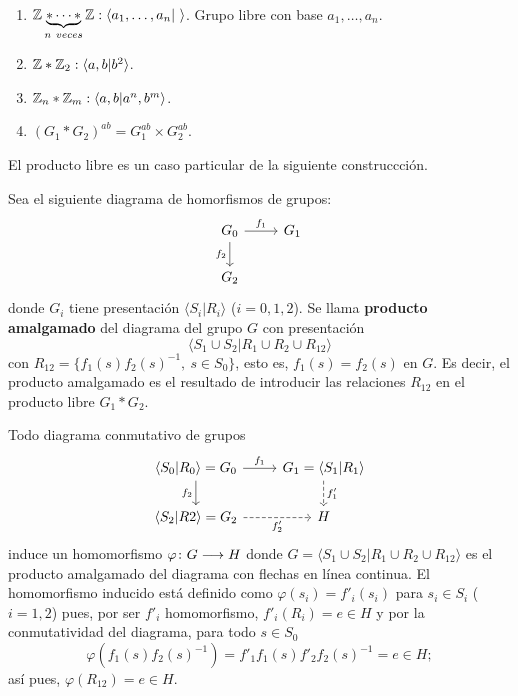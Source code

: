 \documentclass[GTSResumen.tex]{subfiles}
\begin{document}
\begin{ej}\
\begin{enumerate}
\item $\mathbb{Z}\underbrace{*\cdots *}_{n\ veces}\mathbb{Z}: \langle a_1,\dots,a_n|\ \rangle$. Grupo libre con base $a_1,\dots,a_n$.
\item $\mathbb{Z}*\mathbb{Z}_2: \langle a,b|b^2\rangle$.
\item $\mathbb{Z}_n*\mathbb{Z}_m: \langle a,b| a^n,b^m\rangle$.
\item $(G_1*G_2)^{ab}=G_1^{ab}\times G_2^{ab}$. 
\end{enumerate}
\end{ej}

El producto libre es un caso particular de la siguiente construccción.  

\begin{defi}
Sea el siguiente diagrama de homorfismos de grupos:
\[
\begin{tikzcd}
G_0 \ar[r, "f_1"]\arrow[d,"f_2 "'] & G_1\\
G_2
\end{tikzcd}
\]
donde $G_i$ tiene presentación $\langle S_i|R_i\rangle$ ($i=0,1,2$). Se llama \textbf{producto amalgamado} del diagrama del grupo $G$ con presentación
\[
\langle S_1\cup S_2 | R_1\cup R_2\cup R_{12}\rangle
\]
con $R_{12}=\{f^{}_1(s)f^{}_2(s)^{-1},\ s\in S_0\}$, esto es, $f_1(s)=f_2(s)$ en $G$. Es decir, el producto amalgamado es el resultado de introducir las relaciones $R_{12}$ en el producto libre $G_1*G_2$.
\end{defi}

\begin{nota}[Importante] Todo diagrama conmutativo de grupos
\[
\begin{tikzcd}
\langle S_0|R_0\rangle =G_0 \ar[r, "f_1"]\arrow[d,"f_2 "'] & G_1=\langle S_1|R_1\rangle\ar[d,dashed,"f'_1"]\\
\langle S_2|R2 \rangle =G_2\ar[r, dashed, "f'_2"'] & H
\end{tikzcd}
\]
induce un homomorfismo $\varphi\colon{G}\longrightarrow{H}$ donde $G=\langle S_1\cup S_2 | R_1\cup R_2\cup R_{12}\rangle$ es el producto amalgamado del diagrama con flechas en línea continua. El homomorfismo inducido está definido como $\varphi(s_i)=f'_i(s_i)$ para $s_i\in S_i$ ($i=1,2$) pues, por ser $f'_i$ homomorfismo, $f'_i(R_i)=e\in H$ y por la conmutatividad del diagrama, para todo $s\in S_0$
\[
\varphi(f_1(s)f_2(s)^{-1})=f'_1f_1^{}(s)f'_2f_2^{}(s)^{-1}=e\in H;
\]
así pues, $\varphi(R_{12})=e\in H$.
\end{nota}
\end{document}
